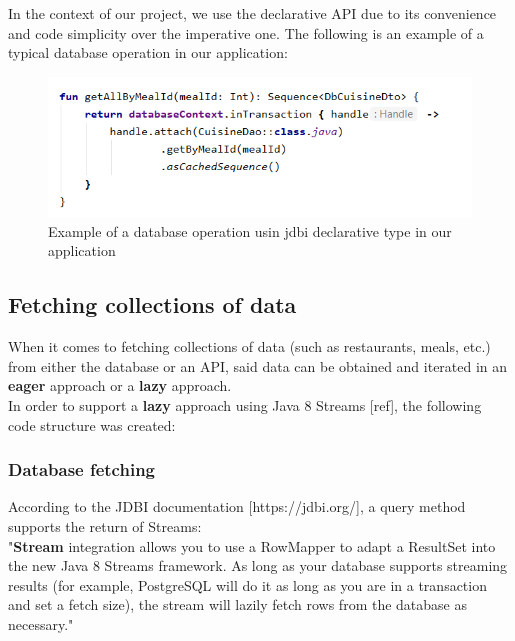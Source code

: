 In the context of our project, we use the declarative API due to its convenience and code simplicity over the
imperative one. The following is an example of a typical database operation in our application:\

\begin{figure}[H]
    \begin{center}
        \includegraphics[scale=0.8]{_figures/jdbi-nutrio.png}
        \caption{Example of a database operation usin jdbi declarative type in our application}
    \end{center}
\end{figure}

\subsection{Fetching collections of data}
When it comes to fetching collections of data (such as restaurants, meals, etc.) from either the database or an API, said data can be obtained
and iterated in an \textbf{eager} approach or a \textbf{lazy} approach.\\

In order to support a \textbf{lazy} approach using Java 8 Streams [ref], the following code structure was created:

\subsubsection{Database fetching}

According to the JDBI documentation [https://jdbi.org/], a query method supports the return of Streams:\\

"\textbf{Stream} integration allows you to use a RowMapper to adapt a ResultSet into the new Java 8 Streams framework.
As long as your database supports streaming results (for example, PostgreSQL will do it as long as you are in a transaction and set a fetch size),
the stream will lazily fetch rows from the database as necessary."\\

